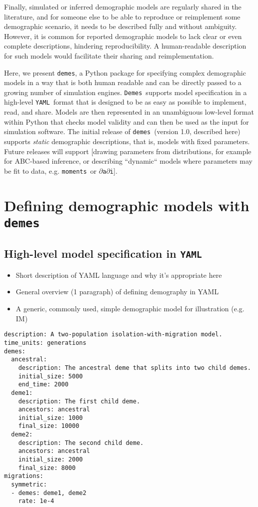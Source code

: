 \documentclass[11pt]{article}
\newenvironment{code}{\captionsetup{type=listing}\centering}{}
\newcommand{\demes}[0]{\texttt{demes}}
\newcommand{\Demes}[0]{\texttt{Demes}}
\newcommand{\YAML}[0]{\texttt{YAML}}
\newcommand{\moments}[0]{\texttt{moments}}
\newcommand{\dadi}[0]{\texttt{$\partial$a$\partial$i}}
\begin{document}
Finally, simulated or inferred demographic models are regularly shared in the
literature, and for someone else to be able to reproduce or reimplement some
demographic scenario, it needs to be described fully and without ambiguity. However,
it is common for reported demographic models to lack clear or even complete
descriptions, hindering reproducibility. A human-readable description for
such models would facilitate their sharing and reimplementation.

Here, we present \demes, a Python package for specifying complex demographic models
in a way that is both human readable and can be directly passed to a growing
number of simulation engines. \Demes\ supports model specification in a high-level
\YAML\ format \citep{ben2009yaml}
that is designed to be as easy as possible to implement, read, and
share. Models are then represented in an unambiguous low-level format within Python
that checks model validity and can then be used as the input for simulation software.
The initial release of \demes\ (version 1.0, described here) supports \emph{static}
demographic descriptions, that is, models with fixed parameters. Future releases
will support [drawing parameters from distributions, for example for ABC-based
inference, or describing ``dynamic`` models where parameters may be fit to data,
e.g. \moments\ or \dadi].

\section*{Defining demographic models with \demes}

\subsection*{High-level model specification in \YAML}

\begin{itemize}
\item Short description of YAML language and why it's appropriate here
\item General overview (1 paragraph) of defining demography in YAML
\item A generic, commonly used, simple demographic model for illustration (e.g. IM)
\end{itemize}

\begin{code}
\label{code:im_model}
\begin{verbatim}
description: A two-population isolation-with-migration model.
time_units: generations
demes:
  ancestral:
    description: The ancestral deme that splits into two child demes.
    initial_size: 5000
    end_time: 2000
  deme1:
    description: The first child deme.
    ancestors: ancestral
    initial_size: 1000
    final_size: 10000
  deme2:
    description: The second child deme.
    ancestors: ancestral
    initial_size: 2000
    final_size: 8000
migrations:
  symmetric:
  - demes: deme1, deme2
    rate: 1e-4
\end{verbatim}
\end{code}
\end{document}
